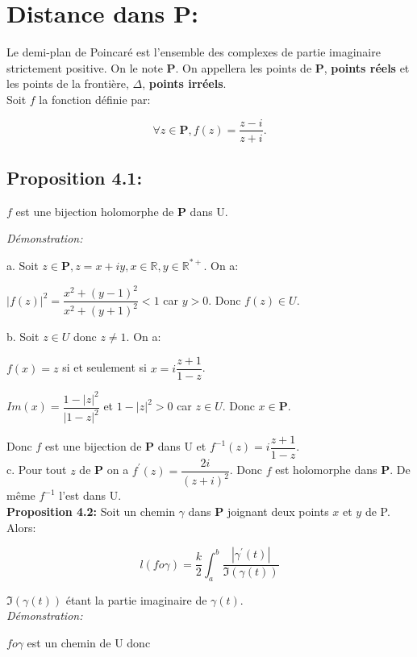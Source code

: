 \documentclass[a4paper, 12pt, twoside]{book}
\begin{document}
\section{Distance dans \textbf{P}:}
  Le demi-plan de Poincaré est l'ensemble des complexes de partie imaginaire strictement positive. On le note \textbf{P}. On appellera les points de \textbf{P}, \textbf{points réels} et les points de la frontière, $\Delta$, \textbf{points irréels}.\\
  
  Soit $f$ la fonction définie par:
    
  $$\forall z \in \boldsymbol{P}, f(z)=\dfrac{z-i}{z+i}.$$
  
\subsection{Proposition 4.1:}
$f$ est une bijection holomorphe de \textbf{P} dans U.


\textit{Démonstration:}
  
  a. Soit $z\in \boldsymbol{P}, z=x+iy, x\in \mathbb{R},y\in \mathbb{R^{*+}}$. On a:
  
  $|f(z)|^{2}=\dfrac{x^{2}+(y-1)^{2}}{x^{2}+(y+1)^{2}}<1$ car $y>0$. Donc $f(z)\in U$.
  
  b. Soit $z\in U$ donc $z\neq 1$. On a:
  
  $f(x)=z$ si et seulement si $x=i\dfrac{z+1}{1-z}$.
  
  $Im(x)=\dfrac{1-|z|^{2}}{|1-z|^{2}}$ et $1-|z|^{2}>0$ car $z\in U$. Donc $x\in \boldsymbol{P}$. 
  
  Donc $f$ est une bijection de \textbf{P} dans U et $f^{-1}(z)=i\dfrac{z+1}{1-z}$.\\

c. Pour tout $z$ de \textbf{P} on a $f^{'}(z)=\dfrac{2i}{(z+i)^{2}}$. Donc $f$ est holomorphe dans \textbf{P}. De même $f^{-1}$
l'est dans U.\\


\newpage \textbf{Proposition 4.2:} Soit un chemin $\gamma$ dans \textbf{P} joignant deux points $x$ et $y$ de P. Alors:\

$$l(fo\gamma)=\dfrac{k}{2}\int_{a}^{b}\dfrac{|\gamma^{'}(t)|}{\Im(\gamma(t))}$$

$\Im(\gamma(t))$ étant la partie imaginaire de $\gamma(t)$.\\

\textit{Démonstration:}

$fo\gamma$ est un chemin de U donc 
\end{document}
